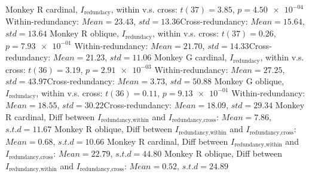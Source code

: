 Monkey R cardinal, $I_\textrm{redundacy}$, within v.s. cross: $t(37) = 3.85$, $p = \num{4.50e-04}$ 
Within-redundancy: $Mean = 23.43$, $std = 13.36$Cross-redundancy: $Mean = 15.64$, $std = 13.64$ 
Monkey R oblique, $I_\textrm{redundacy}$, within v.s. cross: $t(37) = 0.26$, $p = \num{7.93e-01}$ 
Within-redundancy: $Mean = 21.70$, $std = 14.33$Cross-redundancy: $Mean = 21.23$, $std = 11.06$ 
Monkey G cardinal, $I_\textrm{redundacy}$, within v.s. cross: $t(36) = 3.19$, $p = \num{2.91e-03}$ 
Within-redundancy: $Mean = 27.25$, $std = 43.97$Cross-redundancy: $Mean = 3.73$, $std = 50.88$ 
Monkey G oblique, $I_\textrm{redundacy}$, within v.s. cross: $t(36) = 0.11$, $p = \num{9.13e-01}$ 
Within-redundancy: $Mean = 18.55$, $std = 30.22$Cross-redundancy: $Mean = 18.09$, $std = 29.34$ 
Monkey R cardinal, Diff between $I_\textrm{redundancy,within}$ and $I_\textrm{redundancy,cross}$: $Mean = 7.86$, $s.t.d = 11.67$
Monkey R oblique, Diff between $I_\textrm{redundancy,within}$ and $I_\textrm{redundancy,cross}$: $Mean = 0.68$, $s.t.d = 10.66$
Monkey R cardinal, Diff between $I_\textrm{redundancy,within}$ and $I_\textrm{redundancy,cross}$: $Mean = 22.79$, $s.t.d = 44.80$
Monkey R oblique, Diff between $I_\textrm{redundancy,within}$ and $I_\textrm{redundancy,cross}$: $Mean = 0.52$, $s.t.d = 24.89$
